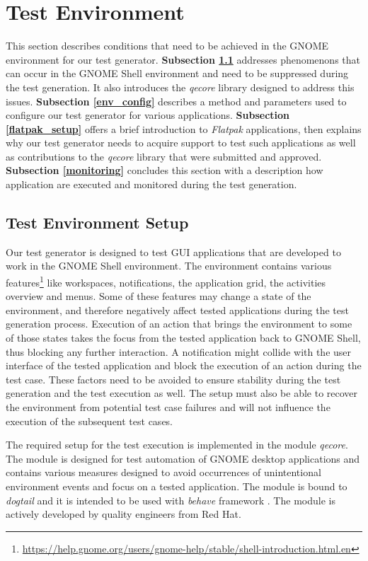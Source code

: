 \section{Test Environment}

This section describes conditions that need to be achieved in the GNOME environment for our test generator. \textbf{Subsection \ref{test_ev_setup}} addresses phenomenons that can occur in the GNOME Shell environment and need to be suppressed during the test generation. It also introduces the \textit{qecore} library designed to address this issues. \textbf{Subsection \ref{env_config}} describes a method and parameters used to configure our test generator for various applications. \textbf{Subsection \ref{flatpak_setup}} offers a brief introduction to \emph{Flatpak} applications, then explains why our test generator needs to acquire support to test such applications as well as contributions to the \textit{qecore} library that were submitted and approved. \textbf{Subsection \ref{monitoring}} concludes this section with a description how application are executed and monitored during the test generation. 

\subsection{Test Environment Setup}\label{test_ev_setup}

Our test generator is designed to test GUI applications that are developed to work in the GNOME Shell environment. The environment contains various features\footnote{\url{https://help.gnome.org/users/gnome-help/stable/shell-introduction.html.en}} like workspaces, notifications, the application grid, the activities overview and menus. Some of these features may change a state of the environment, and therefore negatively affect tested applications during the test generation process. Execution of an action that brings the environment to some of those states takes the focus from the tested application back to GNOME Shell, thus blocking any further interaction. A notification might collide with the user interface of the tested application and block the execution of an action during the test case. These factors need to be avoided to ensure stability during the test generation and the test execution as well. The setup must also be able to recover the environment from potential test case failures and will not influence the execution of the subsequent test cases. 

The required setup for the test execution is implemented in the module \textit{qecore}. The module is designed for test automation of GNOME desktop applications and contains various measures designed to avoid occurrences of unintentional environment events and focus on a tested application. The module is bound to \textit{dogtail} and it is intended to be used with \textit{behave} framework \cite{qecore}. The module is actively developed by quality engineers from Red Hat.

